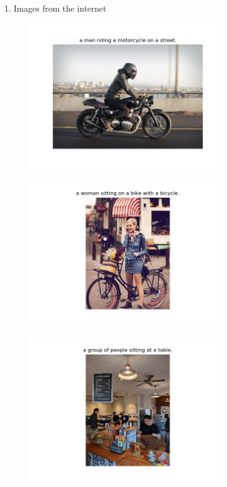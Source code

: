 1. Images from the internet 
\begin{figure}[h!]
\includegraphics[width=0.75\textwidth]{assets/eg/r2_out.jpg}
\end{figure}
\begin{figure}[h!]
\includegraphics[width=0.75\textwidth]{assets/eg/r3_out.jpg}
\end{figure}
\begin{figure}[h!]
\includegraphics[width=0.75\textwidth]{assets/eg/r4_out.jpg}
\end{figure}

